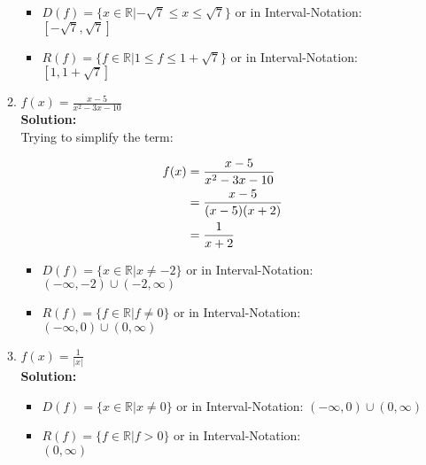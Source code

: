 \documentclass[a4paper]{article}
\begin{document}
\begin{enumerate}
\begin{enumerate}
\begin{itemize}
	\item $D(f) = \{x \in \mathbb{R}| - \sqrt{7} \leq x \leq \sqrt{7}\}$ or in Interval-Notation: $[-\sqrt{7}, \sqrt{7}]$\\ 
	\item $R(f) = \{ f \in \mathbb{R} | 1 \leq f \leq 1 + \sqrt{7}\}$ or in Interval-Notation: \\$[1, 1 + \sqrt{7}]$\\
\end{itemize}	
	
	
	\item $f(x) = \frac{x-5}{x^2-3x-10}$\\
	\textbf{Solution:}\\
	
Trying to simplify the term:

\begin{align*}
	f(x) &= \frac{x-5}{x^2-3x-10}\notag\\
	&= \frac{x-5}{(x-5)(x+2)}\notag\\
	&= \frac{1}{x+2}\notag
\end{align*}	
	
\begin{itemize}
	\item $D(f) = \{x \in \mathbb{R}| x \neq -2\}$ or in Interval-Notation: $(-\infty,-2) \cup (-2, \infty)$\\ 
	\item $R(f) = \{ f \in \mathbb{R} | f \neq 0\}$ or in Interval-Notation: \\$(-\infty,0) \cup (0,\infty)$\\
\end{itemize}	
	
	
	\item $f(x) = \frac{1}{|x|}$\\
	\textbf{Solution:}\\
	
\begin{itemize}
	\item $D(f) = \{x \in \mathbb{R}| x \neq 0\}$ or in Interval-Notation: $(-\infty,0) \cup (0, \infty)$\\ 
	\item $R(f) = \{ f \in \mathbb{R} | f > 0\}$ or in Interval-Notation: \\$(0,\infty)$\\
\end{itemize}	
	
	
\end{enumerate}



\end{enumerate}
\end{document}
